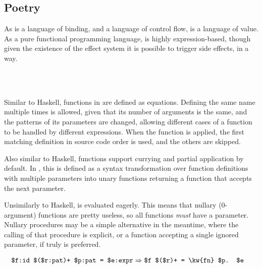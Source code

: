\subsection{Poetry}

As \Law{} is a language of binding, and \Prose{} a language of control
flow, \Poetry{} is a language of value. As a pure functional programming
language, \Poetry{} is highly expression-based, though given the existence
of the effect system it is possible to trigger side effects, in a way.

\begin{bnf*}
     \\
     \\
\end{bnf*}

Similar to Haskell, functions in \Poetry{} are defined as equations. Defining
the same name multiple times is allowed, given that its number of arguments
is the same, and the patterns of its parameters are changed, allowing different
cases of a function to be handled by different expressions. When the function is
applied, the first matching definition in source code order is used, and the
others are skipped.

Also similar to Haskell, functions support currying and partial application by
default. In \Trilogy{}, this is defined as a syntax transformation over function
definitions with multiple parameters into unary functions returning a function
that accepts the next parameter.

Unsimilarly to Haskell, \Poetry{} is evaluated eagerly. This means that nullary
(0-argument) functions are pretty useless, so all functions \emph{must} have a
parameter. Nullary procedures may be a simple alternative in the meantime, where
the calling of that procedure is explicit, or a function accepting a single
ignored  parameter, if truly \Poetry{} is preferred.

\begin{align*}
    \texttt{\$f:id \$(\$r:pat)+ \$p:pat = \$e:expr} & \Rightarrow \texttt{\$f \$(\$r)+ = \kw{fn} \$p. \$e} %
\end{align*}


